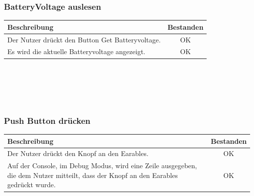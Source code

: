 \documentclass[a4paper,12pt]{article}
\newcommand{\testok}[0]{
	\cellcolor{green!25} OK
}
\begin{document}
\subsubsection{BatteryVoltage auslesen}
\begin{tabular}{ | p{12cm} | c| }
	\hline
	\textbf{Beschreibung} & \textbf{Bestanden}\\
	\hline
	Der Nutzer drückt den Button \glqq{}Get Batteryvoltage\grqq{}. & \testok \\
	\hline
	Es wird die aktuelle Batteryvoltage angezeigt. & \testok \\
	\hline
\end{tabular}
\\ \\ \\ \\
\begin{figure}[h]
	\centering
\end{figure}
\FloatBarrier

\subsubsection{Push Button drücken}
\begin{tabular}{ | p{12cm} | c| }
	\hline
	\textbf{Beschreibung} & \textbf{Bestanden}\\
	\hline
	Der Nutzer drückt den Knopf an den Earables. & \testok \\
	\hline
	Auf der Console, im Debug Modus, wird eine Zeile ausgegeben, die dem Nutzer mitteilt, dass der Knopf an den Earables gedrückt wurde. & \testok \\
	\hline
\end{tabular}
\end{document}
